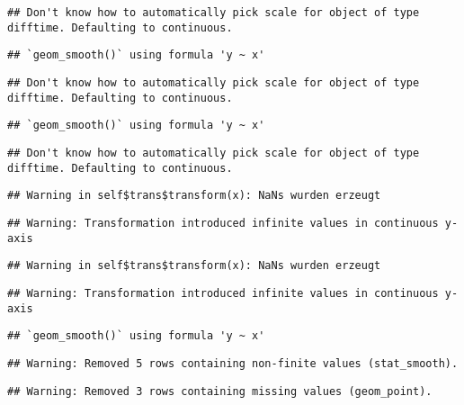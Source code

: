 \documentclass[
]{article}
\begin{document}
\begin{verbatim}
## Don't know how to automatically pick scale for object of type difftime. Defaulting to continuous.
\end{verbatim}

\begin{verbatim}
## `geom_smooth()` using formula 'y ~ x'
\end{verbatim}

\begin{verbatim}
## Don't know how to automatically pick scale for object of type difftime. Defaulting to continuous.
\end{verbatim}

\begin{verbatim}
## `geom_smooth()` using formula 'y ~ x'
\end{verbatim}

\begin{verbatim}
## Don't know how to automatically pick scale for object of type difftime. Defaulting to continuous.
\end{verbatim}

\begin{verbatim}
## Warning in self$trans$transform(x): NaNs wurden erzeugt
\end{verbatim}

\begin{verbatim}
## Warning: Transformation introduced infinite values in continuous y-axis
\end{verbatim}

\begin{verbatim}
## Warning in self$trans$transform(x): NaNs wurden erzeugt
\end{verbatim}

\begin{verbatim}
## Warning: Transformation introduced infinite values in continuous y-axis
\end{verbatim}

\begin{verbatim}
## `geom_smooth()` using formula 'y ~ x'
\end{verbatim}

\begin{verbatim}
## Warning: Removed 5 rows containing non-finite values (stat_smooth).
\end{verbatim}

\begin{verbatim}
## Warning: Removed 3 rows containing missing values (geom_point).
\end{verbatim}
\end{document}
